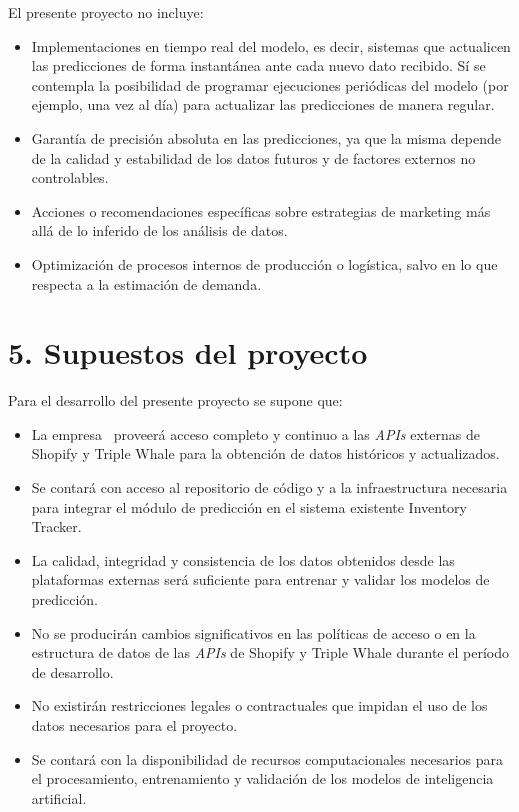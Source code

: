 \documentclass[
11pt, %
]{charter}
\begin{document}
El presente proyecto no incluye:
\begin{itemize}
\item Implementaciones en tiempo real del modelo, es decir, sistemas que actualicen las predicciones de forma instantánea ante cada nuevo dato recibido. Sí se contempla la posibilidad de programar ejecuciones periódicas del modelo (por ejemplo, una vez al día) para actualizar las predicciones de manera regular.
\item Garantía de precisión absoluta en las predicciones, ya que la misma depende de la calidad y estabilidad de los datos futuros y de factores externos no controlables.
\item Acciones o recomendaciones específicas sobre estrategias de marketing más allá de lo inferido de los análisis de datos.
\item Optimización de procesos internos de producción o logística, salvo en lo que respecta a la estimación de demanda.
\end{itemize}



\section{5. Supuestos del proyecto}
\label{sec:supuestos}

Para el desarrollo del presente proyecto se supone que: 

\begin{itemize}
\item La empresa \empclientename\ proveerá acceso completo y continuo a las \textit{APIs} externas de Shopify y Triple Whale para la obtención de datos históricos y actualizados.
\item Se contará con acceso al repositorio de código y a la infraestructura necesaria para integrar el módulo de predicción en el sistema existente Inventory Tracker.
\item La calidad, integridad y consistencia de los datos obtenidos desde las plataformas externas será suficiente para entrenar y validar los modelos de predicción.
\item No se producirán cambios significativos en las políticas de acceso o en la estructura de datos de las \textit{APIs} de Shopify y Triple Whale durante el período de desarrollo.
\item No existirán restricciones legales o contractuales que impidan el uso de los datos necesarios para el proyecto.
\item Se contará con la disponibilidad de recursos computacionales necesarios para el procesamiento, entrenamiento y validación de los modelos de inteligencia artificial.
\end{itemize}
\end{document}
